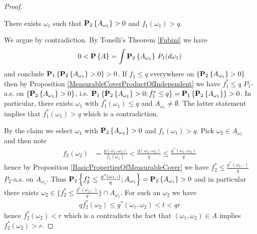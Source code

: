 \begin{proof}
\begin{clm} There exists $\omega_1$ such that $\sprobability{A_{\omega_1}}{2}>0$ and $f_1(\omega_1) > q$.
\end{clm}
We argue by contradiction.   By Tonelli's Theorem \ref{Fubini} we have
\begin{align*}
0 < \probability{A} = \int \sprobability{A_{\omega_1}}{2} \, P_1(d\omega_1)
\end{align*}
and conclude $\sprobability{\sprobability{A_{\omega_1}}{2}>0}{1}>0$.
 If $f_1 \leq q$ everywhere on $\lbrace \sprobability{A_{\omega_1}}{2}>0 \rbrace$ then by Proposition \ref{MeasurableCoverProductOfIndependent} we have $f_1^* \leq q$ $P_1$-a.s. on $\lbrace \sprobability{A_{\omega_1}}{2}>0 \rbrace$, i.e. $\sprobability{\sprobability{A_{\omega_1}}{2}>0; f_1^* \leq q}{1}=\sprobability{\sprobability{A_{\omega_1}}{2}}{1}>0$.
In particular, there exists $\omega_1$ with $f_1^*(\omega_1) \leq q$ and $A_{\omega_1} \neq \emptyset$.  The latter statement implies that $f_1^*(\omega_1) > q$ which is a contradiction.

By the claim we select $\omega_1$ with $\sprobability{A_{\omega_1}}{2}>0$ and $f_1(\omega_1) > q$.  Pick $\omega_2 \in A_{\omega_1}$ and then note
\begin{align*}
f_2(\omega_2) &= \frac{g(\omega_1, \omega_2)}{f_1(\omega_1)} < \frac{g(\omega_1, \omega_2)}{q} \leq \frac{g^*(\omega_1, \omega_2)}{q} 
\end{align*}
hence by Proposition \ref{BasicPropertiesOfMeasurableCover} we have $f_2^* \leq \frac{g^*(\omega_1, \cdot)}{q}$ $P_2$-a.s. on $A_{\omega_1}$.  Thus $\sprobability{f_2^* \leq \frac{g^*(\omega_1, \cdot)}{q}; A_{\omega_1}} {2} = \sprobability{A_{\omega_1}} {2} >0$ and in particular there exists $\omega_2 \in \lbrace f_2^* \leq \frac{g^*(\omega_1, \cdot)}{q} \rbrace \cap A_{\omega_1}$.  For such an
$\omega_2$ we have 
\begin{align*}
q f_2^*(\omega_2) \leq g^*(\omega_1, \omega_2) < t < qr
\end{align*}
hence $f_2^*(\omega_2)<r$ which is a contradicts the fact that $(\omega_1,\omega_2) \in A$ implies $f_2^*(\omega_2)>r$.
\end{proof}

